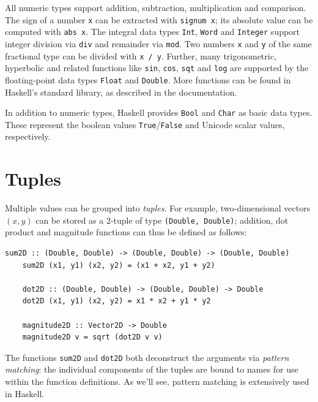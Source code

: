 \documentclass[UdineBachThesis,american,11pt]{PhdThesis}
\begin{document}
  All numeric types support addition, subtraction, multiplication and
  comparison. The sign of a number \texttt{x} can be extracted with
  \mbox{\texttt{signum x}}; its absolute value can be computed with
  \mbox{\texttt{abs x}}. The integral data types \mbox{\texttt{Int}},
  \mbox{\texttt{Word}} and \mbox{\texttt{Integer}} support integer division via
  \mbox{\texttt{div}} and remainder via \mbox{\texttt{mod}}. Two numbers
  \texttt{x} and \texttt{y} of the same fractional type can be divided with
  \mbox{\texttt{x / y}}. Further, many trigonometric, hyperbolic and related
  functions like \mbox{\texttt{sin}}, \mbox{\texttt{cos}}, \mbox{\texttt{sqt}}
  and \mbox{\texttt{log}} are supported by the floating-point data types
  \mbox{\texttt{Float}} and \mbox{\texttt{Double}}. More functions can be found
  in Haskell's standard library, as described in the documentation.

  In addition to numeric types, Haskell provides \mbox{\texttt{Bool}} and
  \mbox{\texttt{Char}} as basic data types. These represent the boolean values
  \mbox{\texttt{True}}/\mbox{\texttt{False}} and Unicode scalar values,
  respectively.

  \section{Tuples}

  Multiple values can be grouped into \emph{tuples}. For example,
  two-dimensional vectors \mbox{$\left(x, y\right)$} can be stored as a 2-tuple
  of type \mbox{\texttt{(Double, Double)}}; addition, dot product and magnitude
  functions can thus be defined as follows:

  \begin{Verbatim}[gobble=4,fontsize=\small]
    sum2D :: (Double, Double) -> (Double, Double) -> (Double, Double)
    sum2D (x1, y1) (x2, y2) = (x1 + x2, y1 + y2)

    dot2D :: (Double, Double) -> (Double, Double) -> Double
    dot2D (x1, y1) (x2, y2) = x1 * x2 + y1 * y2

    magnitude2D :: Vector2D -> Double
    magnitude2D v = sqrt (dot2D v v)
  \end{Verbatim}

  The functions \mbox{\texttt{sum2D}} and \mbox{\texttt{dot2D}} both deconstruct
  the arguments via \emph{pattern matching}: the individual components of the
  tuples are bound to names for use within the function definitions. As we'll
  see, pattern matching is extensively used in Haskell.
\end{document}
